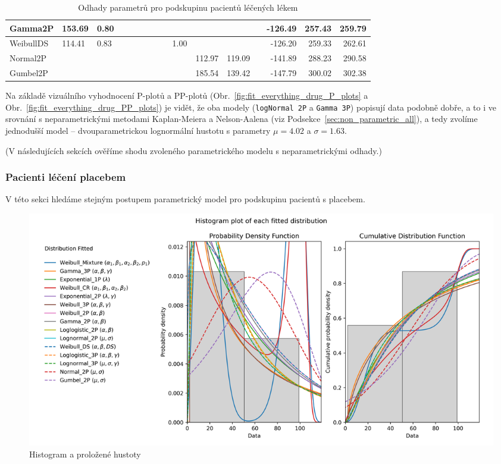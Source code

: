 \documentclass[a4, 11pt]{article}
\theoremstyle{definition}
\theoremstyle{remark}
\begin{document}
\begin{table}[H]
\begin{tabular}{|l|l|l|l|l|l|l|l|l|l|l|l|l|r|r|r|}
        Gamma2P       & 153.69 & 0.80 &      &        &      &        &        &      &      &        &        &      & -126.49 & 257.43 & 259.79 \\ \hline
        WeibullDS     & 114.41 & 0.83 &      &        &      &        &        &      & 1.00 &        &        &      & -126.20 & 259.33 & 262.61 \\ \hline
        Normal2P      &        &      &      &        &      &        &        &      &      & 112.97 & 119.09 &      & -141.89 & 288.23 & 290.58 \\ \hline
        Gumbel2P      &        &      &      &        &      &        &        &      &      & 185.54 & 139.42 &      & -147.79 & 300.02 & 302.38 \\ \hline
    \end{tabular}
    \caption{Odhady parametrů pro podskupinu pacientů léčených lékem}
    \label{tab:fitall_output_parameters_tab}
    \normalsize
\end{table}

	Na základě vizuálního vyhodnocení P-plotů a PP-plotů (Obr.~\ref{fig:fit_everything_drug_P_plots} a Obr.~\ref{fig:fit_everything_drug_PP_plots}) 
	je vidět, že oba modely (\texttt{logNormal 2P} a \texttt{Gamma 3P}) popisují data podobně dobře, a to i ve srovnání s neparametrickými metodami Kaplan-Meiera a Nelson-Aalena (viz Podsekce~\ref{sec:non_parametric_all}), a tedy zvolíme jednodušší model -- dvouparametrickou lognormální hustotu s parametry $\mu = 4.02$ a $\sigma = 1.63$.
    
    (V následujících sekcích ověříme shodu zvoleného parametrického modelu s neparametrickými odhady.)
	
	
	\subsubsection{Pacienti léčení placebem} \label{sec:parametric_placebo}
	
    V této sekci hledáme stejným postupem parametrický model pro podskupinu pacientů s placebem.
	\begin{figure}[H]
		\centering
		\includegraphics[width=0.8\linewidth]{img/fiteverything_placebo_histogram.png}
		\caption{Histogram a proložené hustoty}
		\label{fig:fit_everything_hist_placebo}
	\end{figure}
\end{document}

